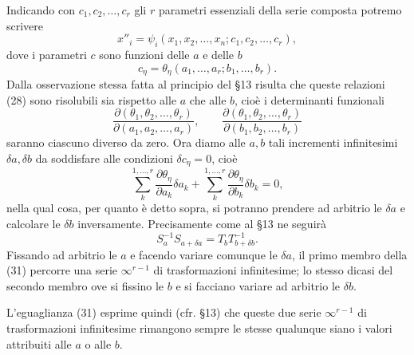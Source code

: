 \documentclass[11pt]{book}
\begin{document}
Indicando con $c_1,c_2,\ldots,c_r$ gli $r$ parametri essenziali della serie composta potremo scrivere
\begin{equation*}\tag{28}
 x''_i=\psi_i(x_1,x_2,\ldots,x_n;c_1,c_2,\ldots,c_r),
\end{equation*}
dove i parametri $c$ sono funzioni delle $a$ e delle $b$
\begin{equation*}\tag{29}
 c_\eta=\theta_\eta(a_1,\ldots,a_r;b_1,\ldots,b_r).
\end{equation*}
Dalla osservazione stessa fatta al principio del \S{}13 risulta che queste relazioni (28) sono risolubili sia rispetto alle $a$ che alle $b$, cioè i determinanti funzionali
\[
 \frac{\partial(\theta_1,\theta_2,\ldots,\theta_r)}{\partial(a_1,a_2,\ldots,a_r)},
 \qquad
 \frac{\partial(\theta_1,\theta_2,\ldots,\theta_r)}{\partial(b_1,b_2,\ldots,b_r)}
\]
saranno ciascuno diverso da zero. Ora diamo alle $a,b$ tali incrementi infinitesimi $\delta a,\delta b$ da soddisfare alle condizioni $\delta c_\eta=0$, cioè
\begin{equation*}\tag{30}
 \sum\limits_k^{1,\ldots,r}\frac{\partial\theta_\eta}{\partial a_k}\delta a_k
 +\sum\limits_k^{1,\ldots,r}\frac{\partial\theta_\eta}{\partial b_k}\delta b_k=0,
\end{equation*}
nella qual cosa, per quanto è detto sopra, si potranno prendere ad arbitrio le $\delta a$ e calcolare le $\delta b$ inversamente. Precisamente come al \S{}13 ne seguirà
\begin{equation*}\tag{31}
 S_a^{-1}S_{a+\delta a}=T_bT_{b+\delta b}^{-1}.
\end{equation*}
Fissando ad arbitrio le $a$ e facendo variare comunque le $\delta a$, il primo membro della (31) percorre una serie $\infty^{r-1}$ di trasformazioni infinitesime; lo stesso dicasi del secondo membro ove si fissino le $b$ e si facciano variare ad arbitrio le $\delta b$.

L'eguaglianza (31) esprime quindi (cfr. \S{}13) che queste due serie $\infty^{r-1}$ di trasformazioni infinitesime rimangono sempre le stesse qualunque siano i valori attribuiti alle $a$ o alle $b$.
\end{document}
